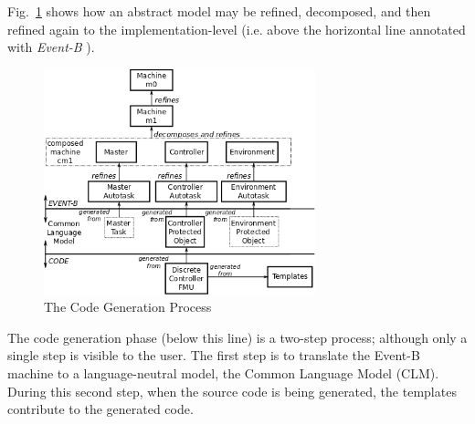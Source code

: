 \documentclass{llncs}%
\begin{document}
Fig.~\ref{fig:CGProcess} shows how an abstract model may be refined, decomposed, and then refined again to the implementation-level (i.e. above the horizontal line annotated with \emph{Event-B} ).
%
\begin{figure}
\centering
\includegraphics[width=0.7\textwidth]{devel.png}
\caption{The Code Generation Process}
\label{fig:CGProcess}
\end{figure}
The code generation phase (below this line) is a two-step process; although only a single step is visible to the user. The first step is to translate the Event-B machine to a language-neutral model, the Common Language Model (CLM). During this second step, when the source code is being generated, the templates contribute to the generated code. 
\end{document}
